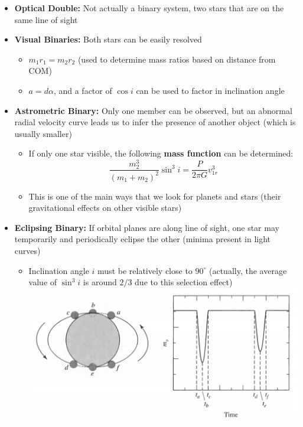 \documentclass[12pt]{article}
\begin{document}
\begin{itemize}
    \item \textbf{Optical Double:} Not actually a binary system, two stars that are on the same line of sight
    \item \textbf{Visual Binaries:} Both stars can be easily resolved
    \begin{itemize}
        \item $m_1r_1 = m_2r_2$ (used to determine mass ratios based on distance from COM)
        \item $a = d\alpha$, and a factor of $\cos{i}$ can be used to factor in inclination angle 
    \end{itemize}
    \item \textbf{Astrometric Binary:} Only one member can be observed, but an abnormal radial velocity curve leads us to infer the presence of another object (which is usually smaller)
    \begin{itemize}
        \item If only one star visible, the following \textbf{mass function} can be determined:
        $$\frac{m_2^3}{(m_1 + m_2)^2}\sin^3{i} = \frac{P}{2\pi G}v_{1r}^3$$
        \item This is one of the main ways that we look for planets and stars (their gravitational effects on other visible stars)
    \end{itemize}
    \item \textbf{Eclipsing Binary:} If orbital planes are along line of sight, one star may temporarily and periodically eclipse the other (minima present in light curves)
    \begin{itemize}
        \item Inclination angle $i$ must be relatively close to $90^{\circ}$ (actually, the average value of $\sin^3 i$ is around $2/3$ due to this selection effect)\newline
        \includegraphics[scale=0.7]{Figures/EclipsingBinaries.png}

\end{itemize}
\end{itemize}
\end{document}
